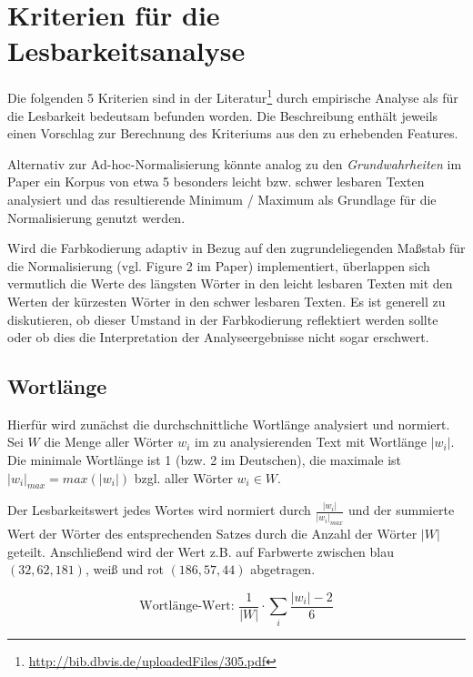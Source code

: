 \documentclass[10pt,a4paper]{article}
\begin{document}
	\section*{Kriterien für die Lesbarkeitsanalyse}
	Die folgenden 5 Kriterien sind in der Literatur\footnote{\url{http://bib.dbvis.de/uploadedFiles/305.pdf}} durch empirische Analyse als für die Lesbarkeit bedeutsam befunden worden. Die Beschreibung enthält jeweils einen Vorschlag zur Berechnung des Kriteriums aus den zu erhebenden Features. 
	
	Alternativ zur Ad-hoc-Normalisierung könnte analog zu den \textit{Grundwahrheiten} im Paper ein Korpus von etwa 5 besonders leicht bzw. schwer lesbaren Texten analysiert und das resultierende Minimum / Maximum als Grundlage für die Normalisierung genutzt werden. 
	
	Wird die Farbkodierung adaptiv in Bezug auf den zugrundeliegenden Maßstab für die Normalisierung (vgl. Figure 2 im Paper) implementiert, überlappen sich vermutlich die Werte des längsten Wörter in den leicht lesbaren Texten mit den Werten der kürzesten Wörter in den schwer lesbaren Texten. Es ist generell zu diskutieren, ob dieser Umstand in der Farbkodierung reflektiert werden sollte oder ob dies die Interpretation der Analyseergebnisse nicht sogar erschwert.
	
	\subsection*{Wortlänge}
	Hierfür wird zunächst die durchschnittliche Wortlänge analysiert und normiert. 
	Sei $ W $ die Menge aller Wörter $ w_i $ im zu analysierenden Text mit Wortlänge $ |w_i| $. Die minimale Wortlänge ist 1 (bzw. 2 im Deutschen), die maximale ist $ |w_i|_{max}=max(|w_i|) $ bzgl. aller Wörter $ w_i\in W $. 
	
	Der Lesbarkeitswert jedes Wortes wird normiert durch $ \frac{|w_i|}{|w_i|_{max}}$ und der summierte Wert der Wörter des entsprechenden Satzes durch die Anzahl der Wörter $ |W| $ geteilt. Anschließend wird der Wert z.B. auf Farbwerte zwischen blau $ (32,62,181) $, weiß und rot $ (186,57,44) $ abgetragen.
		
	\begin{equation*}
		\text{Wortlänge-Wert: }\frac{1}{|W|}\cdot\sum\limits_i \frac{|w_i|-2}{6}
	\end{equation*}
		
\end{document}
